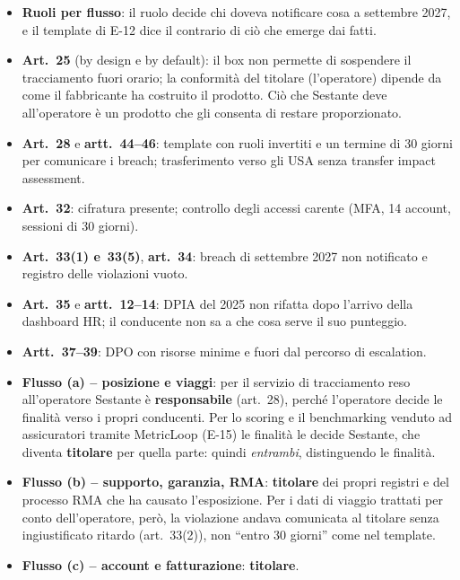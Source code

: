 \begin{itemize}
  \item \textbf{Ruoli per flusso}: il ruolo decide chi doveva notificare cosa a settembre 2027, e il
    template di E-12 dice il contrario di ciò che emerge dai fatti.
  \item \textbf{Art.~25} (by design e by default): il box non permette di sospendere il tracciamento
    fuori orario; la conformità del titolare (l'operatore) dipende da come il fabbricante ha costruito
    il prodotto. Ciò che Sestante deve all'operatore è un prodotto che gli consenta di restare
    proporzionato.
  \item \textbf{Art.~28} e \textbf{artt.~44--46}: template con ruoli invertiti e un termine di 30
    giorni per comunicare i breach; trasferimento verso gli USA senza transfer impact assessment.
  \item \textbf{Art.~32}: cifratura presente; controllo degli accessi carente (MFA, 14 account,
    sessioni di 30 giorni).
  \item \textbf{Art.~33(1) e~33(5)}, \textbf{art.~34}: breach di settembre 2027 non notificato e
    registro delle violazioni vuoto.
  \item \textbf{Art.~35} e \textbf{artt.~12--14}: DPIA del 2025 non rifatta dopo l'arrivo della
    dashboard HR; il conducente non sa a che cosa serve il suo punteggio.
  \item \textbf{Artt.~37--39}: DPO con risorse minime e fuori dal percorso di escalation.
\end{itemize}

\begin{integrazione}
\begin{itemize}
  \item \textbf{Flusso (a) -- posizione e viaggi}: per il servizio di tracciamento reso all'operatore
    Sestante è \textbf{responsabile} (art.~28), perché l'operatore decide le finalità verso i propri
    conducenti. Per lo scoring e il benchmarking venduto ad assicuratori tramite MetricLoop (E-15) le
    finalità le decide Sestante, che diventa \textbf{titolare} per quella parte: quindi
    \emph{entrambi}, distinguendo le finalità.
  \item \textbf{Flusso (b) -- supporto, garanzia, RMA}: \textbf{titolare} dei propri registri e del
    processo RMA che ha causato l'esposizione. Per i dati di viaggio trattati per conto dell'operatore,
    però, la violazione andava comunicata al titolare senza ingiustificato ritardo (art.~33(2)),
    non ``entro 30 giorni'' come nel template.
  \item \textbf{Flusso (c) -- account e fatturazione}: \textbf{titolare}.
\end{itemize}
\end{integrazione}

